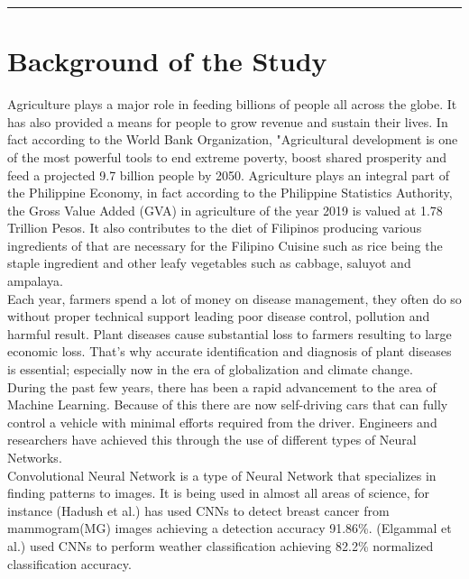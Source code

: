 
\setlength{\headheight}{15pt}
\vspace{-1cm}\noindent\rule{\textwidth}{0.4pt}
\section{Background of the Study}

Agriculture plays a major role in feeding billions of people all
across the globe. It has also provided a means for people
to grow revenue and sustain their lives. In fact according to the 
World Bank Organization, "Agricultural development 
is one of the most powerful tools to end extreme poverty, 
boost shared prosperity and feed a projected 9.7 billion people by 2050.
Agriculture plays an integral 
part of the Philippine Economy, 
in fact according to the Philippine Statistics Authority, the Gross 
Value Added (GVA) in agriculture of the year 2019
is valued at 1.78 Trillion Pesos. 
It also contributes to the diet of Filipinos producing various 
ingredients of that are necessary for the Filipino Cuisine such as rice 
being the staple ingredient and other leafy vegetables such as cabbage,
saluyot and ampalaya. \\



Each year, farmers spend a lot of money on disease management, they 
often do so without proper technical support leading poor disease 
control, pollution and harmful result. Plant diseases cause 
substantial loss to farmers resulting to large economic loss.
That's why accurate identification and diagnosis of plant diseases is 
essential; especially now in the era of globalization and climate 
change. \\

During the past few years, there has been a rapid advancement to the
area of Machine Learning. Because of this there are now self-driving cars 
that can fully control a vehicle with minimal efforts required from the
driver. Engineers and researchers have achieved this through the use 
of different types of Neural Networks. \\

Convolutional Neural Network is a type of Neural Network that specializes 
in finding patterns to images. It is being used in almost all areas of science, 
for instance (Hadush et al.) has used CNNs to detect breast 
cancer from mammogram(MG) images achieving a detection accuracy 91.86\%. 
(Elgammal et al.) used CNNs to perform weather classification achieving 
82.2\% normalized classification accuracy.
\\

